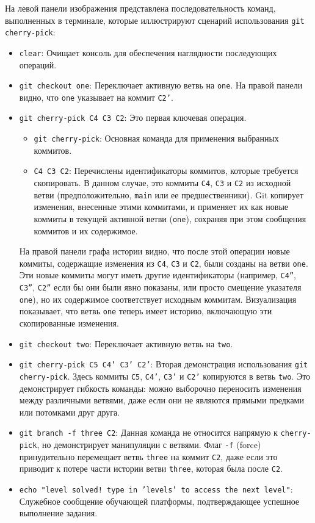 На левой панели изображения представлена последовательность команд, выполненных в терминале, которые иллюстрируют сценарий использования \texttt{git cherry-pick}:
\begin{itemize}
    \item \texttt{clear}: Очищает консоль для обеспечения наглядности последующих операций.
    \item \texttt{git checkout one}: Переключает активную ветвь на \texttt{one}.
    На правой панели видно, что \texttt{one} указывает на коммит \texttt{C2'}.
    \item \texttt{git cherry-pick C4 C3 C2}: Это первая ключевая операция.
    \begin{itemize}
        \item \texttt{git cherry-pick}: Основная команда для применения выбранных коммитов.
        \item \texttt{C4 C3 C2}: Перечислены идентификаторы коммитов, которые требуется скопировать.
        В данном случае, это коммиты \texttt{C4}, \texttt{C3} и \texttt{C2} из исходной ветви (предположительно, \texttt{main} или ее предшественники).
        Git копирует изменения, внесенные этими коммитами, и применяет их как новые коммиты в текущей активной ветви (\texttt{one}), сохраняя при этом сообщения коммитов и их содержимое.
    \end{itemize}
    На правой панели графа истории видно, что после этой операции новые коммиты, содержащие изменения из \texttt{C4}, \texttt{C3} и \texttt{C2}, были созданы на ветви \texttt{one}.
    Эти новые коммиты могут иметь другие идентификаторы (например, \texttt{C4''}, \texttt{C3''}, \texttt{C2''} если бы они были явно показаны, или просто смещение указателя \texttt{one}), но их содержимое соответствует исходным коммитам.
    Визуализация показывает, что ветвь \texttt{one} теперь имеет историю, включающую эти скопированные изменения.
    \item \texttt{git checkout two}: Переключает активную ветвь на \texttt{two}.
    \item \texttt{git cherry-pick C5 C4' C3' C2'}: Вторая демонстрация использования \texttt{git cherry-pick}.
    Здесь коммиты \texttt{C5}, \texttt{C4'}, \texttt{C3'} и \texttt{C2'} копируются в ветвь \texttt{two}.
    Это демонстрирует гибкость команды: можно выборочно переносить изменения между различными ветвями, даже если они не являются прямыми предками или потомками друг друга.
    \item \texttt{git branch -f three C2}: Данная команда не относится напрямую к \texttt{cherry-pick}, но демонстрирует манипуляции с ветвями.
    Флаг \texttt{-f} (force) принудительно перемещает ветвь \texttt{three} на коммит \texttt{C2}, даже если это приводит к потере части истории ветви \texttt{three}, которая была после \texttt{C2}.
    \item \texttt{echo "level solved! type in 'levels' to access the next level"}: Служебное сообщение обучающей платформы, подтверждающее успешное выполнение задания.
\end{itemize}

